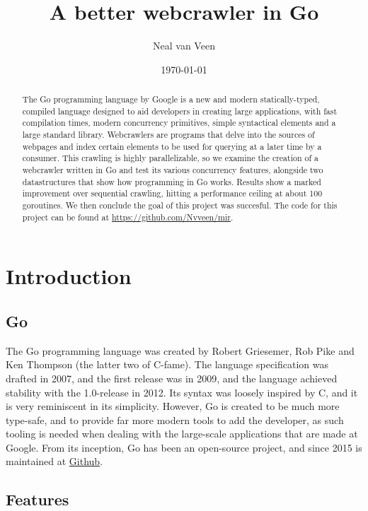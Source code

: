 \documentclass[]{article}
\title{A better webcrawler in Go\\\vspace{0.5em}{\large Multimedia Information Retrieval}}
\author{Neal van Veen}
\date{\today}
\begin{document}
\maketitle
\begin{abstract}
The Go programming language by Google is a new and modern
statically-typed, compiled language designed to aid developers in
creating large applications, with fast compilation times, modern
concurrency primitives, simple syntactical elements and a large standard
library. Webcrawlers are programs that delve into the sources of
webpages and index certain elements to be used for querying at a later
time by a consumer. This crawling is highly parallelizable, so we
examine the creation of a webcrawler written in Go and test its various
concurrency features, alongside two datastructures that show how
programming in Go works. Results show a marked improvement over
sequential crawling, hitting a performance ceiling at about 100
goroutines. We then conclude the goal of this project was succesful. The
code for this project can be found at
\url{https://github.com/Nvveen/mir}.
\end{abstract}

\section{Introduction}\label{introduction}

\subsection{Go}\label{go}

The Go programming language was created by Robert Griesemer, Rob Pike
and Ken Thompson (the latter two of C-fame). The language specification
was drafted in 2007, and the first release was in 2009, and the language
achieved stability with the 1.0-release in 2012. Its syntax was loosely
inspired by C, and it is very reminiscent in its simplicity. However, Go
is created to be much more type-safe, and to provide far more modern
tools to add the developer, as such tooling is needed when dealing with
the large-scale applications that are made at Google. From its
inception, Go has been an open-source project, and since 2015 is
maintained at \href{https://github.com/golang}{Github}.

\subsection{Features}\label{features}
\end{document}
